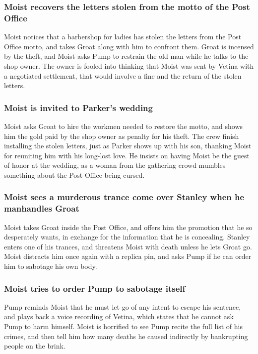 \subsubsection{\Gls{Moist} recovers the letters stolen from the motto of the Post Office}
\Gls{Moist} notices that a barbershop for ladies has stolen the letters from the Post Office motto,
and takes \Gls{Groat} along with him to confront them. \Gls{Groat} is incensed by the theft, and
\Gls{Moist} asks \Gls{Pump} to restrain the old man while he talks to the shop owner. The owner is
fooled into thinking that \Gls{Moist} was sent by \Gls{Vetina} with a negotiated settlement, that
would involve a fine and the return of the stolen letters.

\subsubsection{\Gls{Moist} is invited to \Gls{Parker}'s wedding}
\Gls{Moist} asks \Gls{Groat} to hire the workmen needed to restore the motto, and shows him the
gold paid by the shop owner as penalty for his theft. The crew finish installing the stolen letters,
just as \Gls{Parker} shows up with his son, thanking \Gls{Moist} for reuniting him with his
long-lost love. He insists on having \Gls{Moist} be the guest of honor at the wedding, as a woman
from the gathering crowd mumbles something about the Post Office being cursed.

\subsubsection{\Gls{Moist} sees a murderous trance come over \Gls{Stanley} when he manhandles
    \Gls{Groat}}
\Gls{Moist} takes \Gls{Groat} inside the Post Office, and offers him the promotion that he so
desperately wants, in exchange for the information that he is concealing. \Gls{Stanley} enters one
of his trances, and threatens \Gls{Moist} with death unless he lets \Gls{Groat} go. \Gls{Moist}
distracts him once again with a replica pin, and asks \Gls{Pump} if he can order him to sabotage his
own body.

\subsubsection{\Gls{Moist} tries to order \Gls{Pump} to sabotage itself}
\Gls{Pump} reminds \Gls{Moist} that he must let go of any intent to escape his sentence, and plays
back a voice recording of \Gls{Vetina}, which states that he cannot ask \Gls{Pump} to harm himself.
\Gls{Moist} is horrified to see \Gls{Pump} recite the full list of his crimes, and then tell him
how many deaths he caused indirectly by bankrupting people on the brink.


